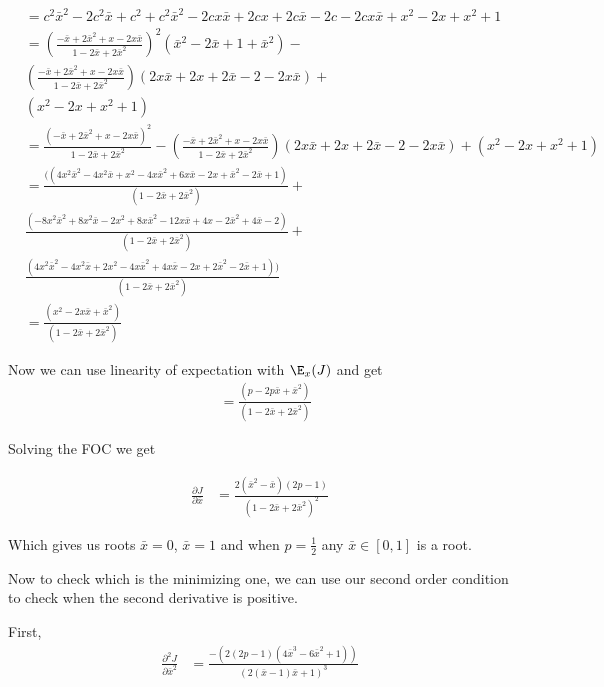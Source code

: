   \begin{align*}
	  &=c^2\bar{x}^2-2c^2\bar{x}+c^2+c^2\bar{x}^2-2cx\bar{x}+2cx+2c\bar{x}-2c-2cx\bar{x} +x^2-2x+x^2 +1 \\
	  &=(\frac{-\bar{x} + 2 \bar{x}^2+ x - 2x\bar{x}}{1-2 \bar{x} + 2\bar{x}^2})^2(\bar{x}^2-2\bar{x}+1+\bar{x}^2)- \\
	  &(\frac{-\bar{x} + 2 \bar{x}^2+ x - 2x\bar{x}}{1-2 \bar{x} + 2\bar{x}^2})(2x\bar{x}+2x+2\bar{x}-2-2x\bar{x}) + \\
	  &(x^2-2x+x^2 +1)  \\
	  &=\frac{(-\bar{x} + 2 \bar{x}^2+ x - 2x\bar{x})^2}{1-2 \bar{x} + 2\bar{x}^2}-(\frac{-\bar{x} + 2 \bar{x}^2+ x - 2x\bar{x}}{1-2 \bar{x} + 2\bar{x}^2})(2x\bar{x}+2x+2\bar{x}-2-2x\bar{x}) +(x^2-2x+x^2 +1) \\
	  &= \frac{((4x^2\bar{x}^2-4x^2\bar{x}+x^2-4x\bar{x}^2+6x\bar{x}-2x+\bar{x}^2-2\bar{x}+1)}{(1 - 2\bar{x} + 2\bar{x}^2)} + \\
	  &\frac{(-8x^2\bar{x}^2+8x^2\bar{x}-2x^2+8x\bar{x}^2-12x\bar{x}+4x-2\bar{x}^2+4\bar{x}-2)}{(1 - 2\bar{x} + 2\bar{x}^2)}+\\
	  &\frac{(4x^2\bar{x}^2-4x^2\bar{x}+2x^2-4x\bar{x}^2+4x\bar{x}-2x+2\bar{x}^2-2\bar{x}+1))}{(1 - 2\bar{x} + 2\bar{x}^2)} \\
	  &= \frac{(x^2-2x\bar{x}+\bar{x}^2)}{(1 - 2\bar{x} + 2\bar{x}^2)}
\end{align*}

Now we can use linearity of expectation with $\E_x (J)$ and get
 \begin{align*}
	  &= \frac{(p-2p\bar{x}+\bar{x}^2)}{(1 - 2\bar{x} + 2\bar{x}^2)}
\end{align*} 

Solving the FOC we get

\begin{align*}
	\frac{\partial J}{\partial \bar{x}} 
	&= \frac{2(\bar{x}^2 - \bar{x})(2p - 1)}{(1 - 2\bar{x} + 2\bar{x}^2)^2}
\end{align*} 

Which gives us roots
$\bar{x} = 0$, $\bar{x} = 1$ and when  $p = \frac{1}{2}$ any $\bar{x} \in [0,1]$ is a root.

Now to check which is the minimizing one, we can use our second order condition to check when the second derivative is positive.

First,
\begin{align*}
	\frac{\partial^2 J}{\partial \bar{x}^2} 
	&= \frac{-(2(2p-1)(4\bar{x}^3-6\bar{x}^2+1))}{(2(\bar{x}-1)\bar{x}+1)^3}
\end{align*}

